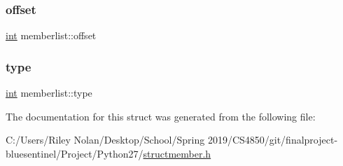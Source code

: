 \mbox{\label{structmemberlist_a55dfff380cf83407e78a6bb7913f5d7d}} 
\subsubsection{\texorpdfstring{offset}{offset}}
{\footnotesize\ttfamily \mbox{\hyperlink{warnings_8h_a74f207b5aa4ba51c3a2ad59b219a423b}{int}} memberlist\+::offset}

\mbox{\label{structmemberlist_a03754cfbc59d653366c4165d2682d485}} 
\subsubsection{\texorpdfstring{type}{type}}
{\footnotesize\ttfamily \mbox{\hyperlink{warnings_8h_a74f207b5aa4ba51c3a2ad59b219a423b}{int}} memberlist\+::type}



The documentation for this struct was generated from the following file\+:\begin{DoxyCompactItemize}
\item 
C\+:/\+Users/\+Riley Nolan/\+Desktop/\+School/\+Spring 2019/\+C\+S4850/git/finalproject-\/bluesentinel/\+Project/\+Python27/\mbox{\hyperlink{structmember_8h}{structmember.\+h}}\end{DoxyCompactItemize}
